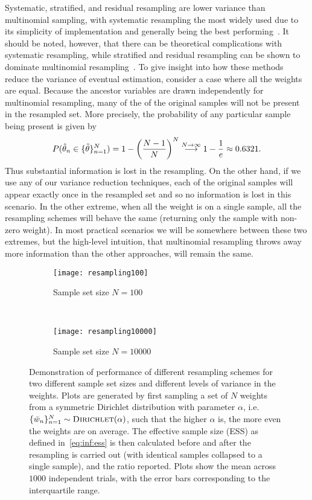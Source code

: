 Systematic, stratified, and residual resampling are lower variance than multinomial sampling, 
with systematic resampling the most widely used due to its simplicity of implementation and
generally being the best performing~\citep{doucet2009tutorial}.  It should be noted, however, that
there can be theoretical complications with systematic resampling, while stratified and 
residual resampling can be shown to dominate multinomial resampling~\citep{douc2005comparison}.
To give insight into how these methods reduce the variance of eventual estimation, consider
a case where all the weights are equal.  Because the ancestor variables are drawn independently
for multinomial resampling, many of the of the original samples will not be present in the resampled
set.  More precisely, the probability of any particular sample being present is given by
\[
P(\hat{\theta}_n \in \{\tilde{\theta}\}_{n=1}^N) = 1-\left(\frac{N-1}{N}\right)^{N} 
\overset{N\to\infty}{\longrightarrow} 1-\frac{1}{e} \approx 0.6321.
\]
Thus substantial information is lost in the resampling.
On the other hand, if we use any of our variance reduction techniques, each of the original samples
will appear exactly once in the resampled set and so no information is lost in this scenario.  In the
other extreme, when all the weight is on a single sample, all the resampling schemes will behave the
same (returning only the sample with non-zero weight).  In most practical scenarios we will be
somewhere between these two extremes, but the high-level intuition, that multinomial resampling
throws away more information than the other approaches, will remain the same.

\begin{figure}[t]
	\centering
	\begin{subfigure}[t]{0.49\textwidth}
	\texttt{[image: resampling100]}
	\caption{Sample set size $N=100$}
	\end{subfigure}
	~
	\begin{subfigure}[t]{0.49\textwidth}
	\texttt{[image: resampling10000]}
	\caption{Sample set size $N=10000$}
	\end{subfigure}
	\vspace{5pt}
	\caption{Demonstration of performance of different resampling schemes for
		two different sample set sizes and different levels of variance in the weights.
		Plots are generated by first sampling a set of $N$ weights from a symmetric
		Dirichlet distribution with parameter $\alpha$, i.e.~$\{\bar{w}_n\}_{n=1}^N \sim \textsc{Dirichlet}(\alpha)$, 
		such that the
		higher $\alpha$ is, the more even the weights are on average.  The effective
		sample size (ESS) as defined in~\eqref{eq:inf:ess} is then calculated before and after the
		resampling is carried out (with identical samples collapsed to a single sample), and the ratio 
		reported.  Plots show the mean across $1000$ independent trials, with the
		error bars corresponding to the interquartile range.
		\label{fig:inf:resample}}
\end{figure}

